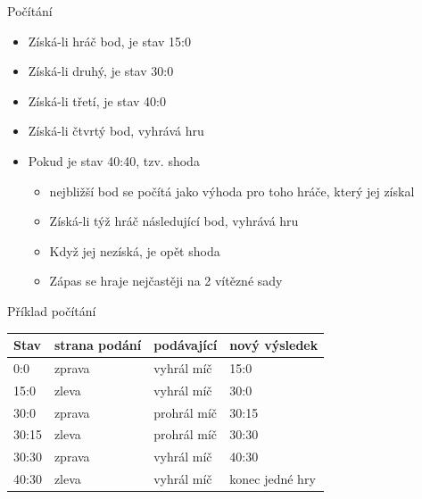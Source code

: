 \documentclass[pdf, fyma2]{prosper}
\begin{document}
 {
\begin{slide}{Počítání}
  \begin{itemize}
    \item{Získá-li hráč bod, je stav 15:0}
    \item{Získá-li druhý, je stav 30:0} 
    \item{Získá-li třetí, je stav 40:0}
    \item{Získá-li čtvrtý bod, vyhrává hru}
    \item{Pokud je stav 40:40, tzv. shoda}
     {
    \begin{itemize}
      \item{nejbližší bod se počítá jako výhoda pro toho hráče, který jej získal}
      \item{Získá-li týž hráč následující bod, vyhrává hru} 
      \item{Když jej nezíská, je opět shoda}
      \item{Zápas se hraje nejčastěji na 2 vítězné sady}
    \end{itemize}
    }
  \end{itemize}
\end{slide}}

\begin{slide}{Příklad počítání}
  \begin{table}[h]
  \begin{center}
    \begin{tabular}{| l | l | l | l |}
    \hline
    \textbf{Stav} 	& \textbf{strana podání}	& \textbf{podávající} 	& \textbf{nový výsledek} \\
    \hline
    0:0 	& zprava	& vyhrál míč	& 15:0 \\
    \hline
    15:0	& zleva		& vyhrál míč	& 30:0 \\
    \hline
    30:0	& zprava	& prohrál míč	& 30:15 \\
    \hline
    30:15	& zleva		& prohrál míč	& 30:30 \\
    \hline
    30:30	& zprava	& vyhrál míč	& 40:30 \\
    \hline
    40:30	& zleva		& vyhrál míč	& konec jedné hry \\
    \hline
    \end{tabular}
  \end{center}
  \end{table}
\end{slide}
\end{document}
